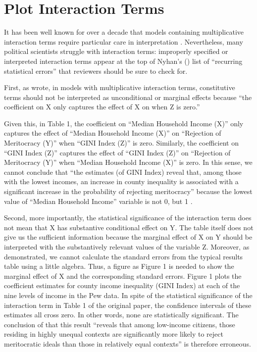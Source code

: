 
\section{Plot Interaction Terms}

It has been well known for over a decade that models containing multiplicative interaction terms require particular care in interpretation \citep[see, e.g.,][]{Golder2003, Braumoeller2004, Brambor2006, Kam2007}. Nevertheless, many political scientists struggle with interaction terms: improperly specified or interpreted interaction terms appear at the top of Nyhan's (\citeyear{Nyhan2015}) list of ``recurring statistical errors'' that reviewers should be sure to check for. %

First, as \citet[71-72]{Brambor2006} wrote, in models with multiplicative interaction terms, constitutive terms should not be interpreted as unconditional or marginal effects because ``the coefficient on X only captures the effect of X on when Z is zero.'' 


Given this, in Table 1, the coefficient on ``Median Household Income (X)'' only captures the effect of ``Median Household Income (X)'' on ``Rejection of Meritocracy (Y)'' when ``GINI Index (Z)'' is zero. Similarly, the coefficient on ``GINI Index (Z)'' captures the effect of ``GINI Index (Z)'' on ``Rejection of Meritocracy (Y)'' when ``Median Household Income (X)'' is zero. In this sense, we cannot conclude that ``the estimates (of GINI Index) reveal that, among those with the lowest incomes, an increase in county inequality is associated with a significant increase in the probability of rejecting meritocracy'' \citep[334]{Newman, Johnston, and Lown2015a} because the lowest value of ``Median Household Income'' variable is not 0, but 1 \citep{Newman2015a, 332}. 

Second, more importantly, the statistical significance of the interaction term does not mean that X has substantive conditional effect on Y. The table itself does not give us the sufficient information because the marginal effect of X on Y should be interpreted with the substantively relevant values of the variable Z. Moreover, as \citet[74]{Brambor2006} demonstrated, we cannot calculate the standard errors from the typical results table using a little algebra. Thus, a figure as Figure 1 is needed to show the marginal effect of X and the corresponding standard errors. Figure 1 plots the coefficient estimates for county income inequality (GINI Index) at each of the nine levels of income in the Pew data. In spite of the statistical significance of the interaction term in Table 1 of the original paper, the confidence intervals of these estimates all cross zero. In other words, none are statistically significant. The conclusion of \citet[334]{Newman2015a} that this result ``reveals that among low-income citizens, those residing in highly unequal contexts are significantly more likely to reject meritocratic ideals than those in relatively equal contexts'' is therefore erroneous.


